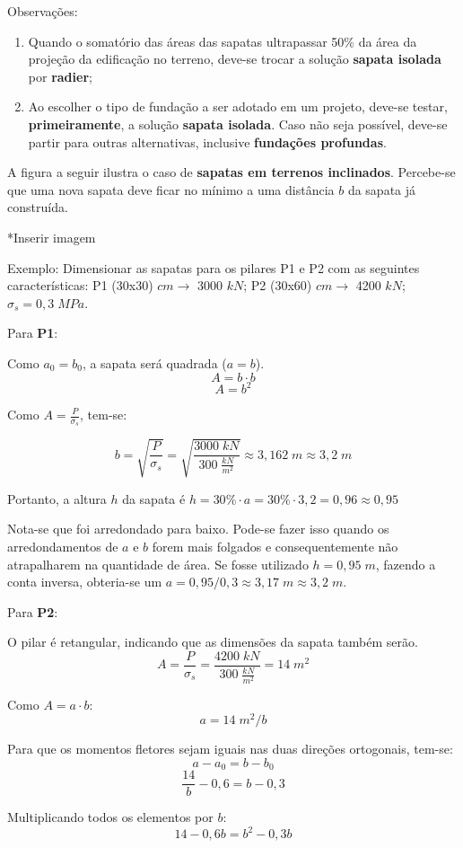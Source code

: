 Observações:

\begin{enumerate}
	\item Quando o somatório das áreas das sapatas ultrapassar 50\% da área da projeção da edificação no terreno, deve-se trocar a solução \textbf{sapata isolada} por \textbf{radier};
	\item Ao escolher o tipo de fundação a ser adotado em um projeto, deve-se testar, \textbf{primeiramente}, a solução \textbf{sapata isolada}. Caso não seja possível, deve-se partir para outras alternativas, inclusive \textbf{fundações profundas}.
\end{enumerate}

A figura a seguir ilustra o caso de \textbf{sapatas em terrenos inclinados}. Percebe-se que uma nova sapata deve ficar no mínimo a uma distância $b$ da sapata já construída.

*Inserir imagem

Exemplo: Dimensionar as sapatas para os pilares P1 e P2 com as seguintes características:
P1 (30x30) $cm\rightarrow$ 3000 $kN$; P2 (30x60) $cm\rightarrow$ 4200 $kN$; $\sigma_s=0,3\;MPa$.

Para \textbf{P1}:

Como $a_0=b_0$, a sapata será quadrada ($a=b$). $$A=b\cdot b$$ $$A=b^2$$

Como $A=\frac{P}{\sigma_s}$, tem-se:

$$b=\sqrt{\frac{P}{\sigma_s}}=\sqrt{\frac{3000\;kN}{300\;\frac{kN}{m^2}}}\approx3,162\;m\approx3,2\;m$$

Portanto, a altura $h$ da sapata é $h=30\%\cdot a=30\%\cdot 3,2=0,96\approx0,95$

Nota-se que foi arredondado para baixo. Pode-se fazer isso quando os arredondamentos de $a$ e $b$ forem mais folgados e consequentemente não atrapalharem na quantidade de área. Se fosse utilizado $h=0,95\;m$, fazendo a conta inversa, obteria-se um $a=0,95/0,3\approx3,17\;m\approx3,2\;m$.

Para \textbf{P2}:

O pilar é retangular, indicando que as dimensões da sapata também serão.
$$A=\frac{P}{\sigma_s}=\frac{4200\;kN}{300\;\frac{kN}{m^2}}=14\;m^2$$

Como $A=a\cdot b$:
$$a=14\;m^2/b$$

Para que os momentos fletores sejam iguais nas duas direções ortogonais, tem-se:
$$a-a_0=b-b_0$$
$$\frac{14}{b}-0,6=b-0,3$$

Multiplicando todos os elementos por $b$:
$$14-0,6b=b^2-0,3b$$


